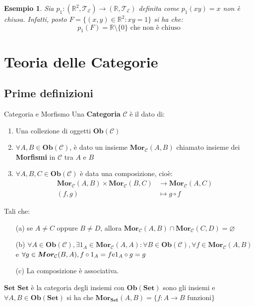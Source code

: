 \documentclass[11pt,a4paper,twoside]{article}
\newtheorem{es}{Esempio}
\theoremstyle{definition}
\begin{document}
\begin{es}
	Sia $p_1 \colon (\mathbb R^2, \mathcal T_\mathcal E) \to (\mathbb R, \mathcal T_\mathcal E)$ definita come $p_1(xy) = x$ non è chiusa. Infatti, posto $F = \{(x, y) \in \mathbb R^2: xy = 1\}$ si ha che:
	\[ p_1(F) = \mathbb R\setminus \{0\} \text{ che non è chiuso}\]
\end{es}

\newpage

\section{Teoria delle Categorie}
\subsection{Prime definizioni}

\begin{defn}{Categoria e Morfismo}{}
	Una \textbf{Categoria} $\mathcal C$ è il dato di:
	\begin{enumerate}
		\item Una collezione di oggetti $\bm{Ob}(\mathcal C)$
		\item $\forall A, B \in \bm{Ob}(\mathcal C)$, è dato un insieme $\bm{Mor}_\mathcal C(A, B)$ chiamato insieme dei \textbf{Morfismi} in $\mathcal C$ tra $A$ e $B$
		\item $\forall A, B, C \in \bm{Ob}(\mathcal C)$ è data una composizione, cioè:
			\begin{align*}
				\bm{Mor}_\mathcal C(A, B) \times \bm{Mor}_\mathcal C(B, C) & \to \bm{Mor}_\mathcal C(A, C)\\
				(f, g) & \mapsto g \circ f
			\end{align*}
	\end{enumerate}
	Tali che:
	\begin{itemize}
		\item[(a)] se $A \neq C$ oppure $B \neq D$, allora $\bm{Mor}_\mathcal C(A, B) \cap \bm{Mor}_\mathcal C(C, D) = \varnothing$
		\item[(b)] $\forall A \in \bm{Ob}(\mathcal C), \exists 1_A \in \bm{Mor}_\mathcal C(A, A) : \forall B \in \bm{Ob}(\mathcal C), \forall f \in \bm{Mor}_\mathcal C(A, B)$ e $\forall g \in \bm{Mor}_\mathcal C(B, A), f \circ 1_A = f \text e 1_A \circ g = g$
		\item[(c)] La composizione è associativa.
	\end{itemize}
\end{defn}

\begin{defn}{$\bm{Set}$}{}
	$\bm{Set}$ è la categoria degli insiemi con $\bm{Ob}(\bm{Set})$ sono gli insiemi e $\forall A, B \in \bm{Ob}(\bm{Set})$ si ha che $\bm{Mor}_{\bm{Set}}(A, B) = \{f \colon A \to B \text{ funzioni}\}$
\end{defn}
\end{document}
